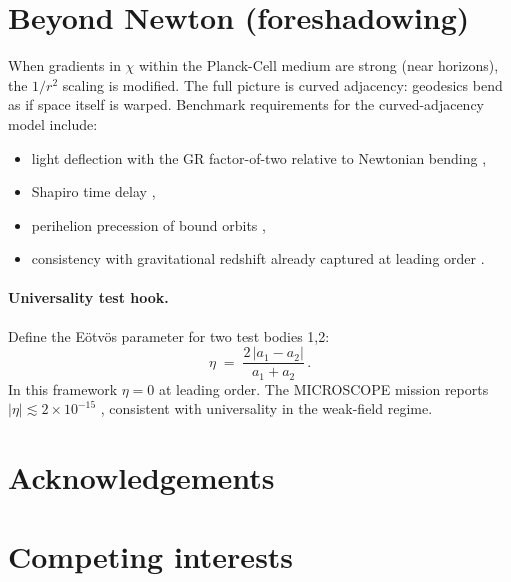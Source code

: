 \documentclass[11pt,oneside]{article}
\begin{document}
\section{Beyond Newton (foreshadowing)}
When gradients in $\chi$ within the Planck-Cell medium are strong (near horizons), the $1/r^2$ scaling is modified.
The full picture is curved adjacency: geodesics bend as if space itself is warped.
Benchmark requirements for the curved-adjacency model include:
\begin{itemize}
  \item light deflection with the GR factor-of-two relative to Newtonian bending \cite{eddington1920,will2014confrontation},
  \item Shapiro time delay \cite{will2014confrontation},
  \item perihelion precession of bound orbits \cite{will2014confrontation},
  \item consistency with gravitational redshift already captured at leading order \cite{einstein1916foundation,will2014confrontation}.
\end{itemize}

\paragraph{Universality test hook.}
Define the E\"otv\"os parameter for two test bodies 1,2:
\[
\eta \;=\; \frac{2\,|a_1-a_2|}{a_1+a_2}\,.
\]
In this framework $\eta=0$ at leading order. The MICROSCOPE mission reports $|\eta|\lesssim 2\times 10^{-15}$ \cite{touboul2022microscope}, consistent with universality in the weak-field regime.

\clearpage
\section*{Acknowledgements}

\section*{Competing interests}
\end{document}
